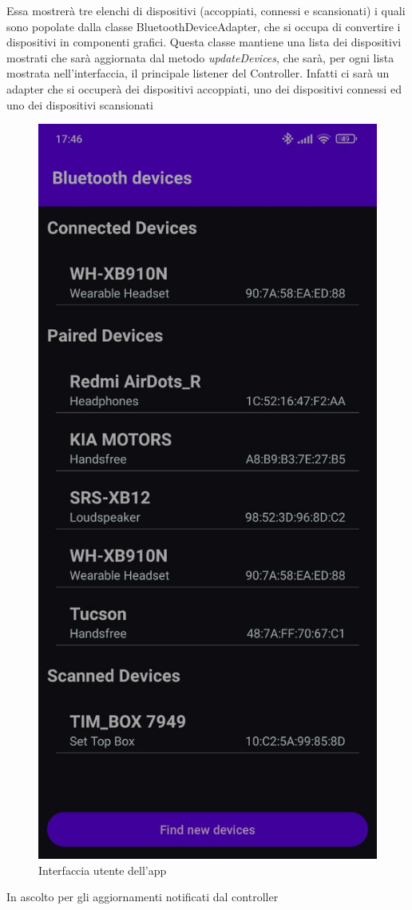 Essa mostrerà tre elenchi di dispositivi (accoppiati, connessi e scansionati) i quali sono popolate dalla classe BluetoothDeviceAdapter, che si occupa di convertire i dispositivi in componenti grafici. Questa classe mantiene una lista dei dispositivi mostrati che sarà aggiornata dal metodo \textit{updateDevices}, che sarà, per ogni lista mostrata nell'interfaccia, il principale listener del Controller. Infatti ci sarà un adapter che si occuperà dei dispositivi accoppiati, uno dei dispositivi connessi ed uno dei dispositivi scansionati
\begin{figure}
    \centering
    \includegraphics[width=0.9\linewidth]{images/separate_app.png}
    \caption{Interfaccia utente dell'app}
    \label{fig:separate_app}
\end{figure}
In ascolto per gli aggiornamenti notificati dal controller



